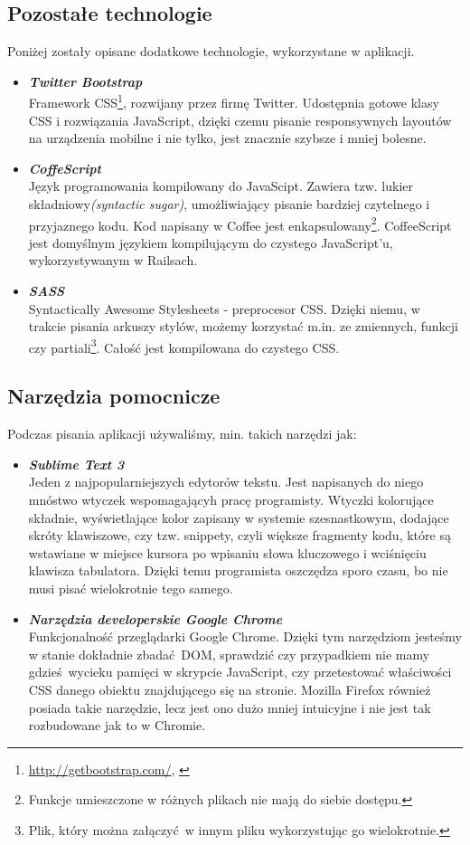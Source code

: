   \subsection{Pozostałe technologie}
    \label{other_technology}
    Poniżej zostały opisane dodatkowe technologie, wykorzystane w aplikacji.
    \begin{itemize}
      \item \textbf{\emph{Twitter Bootstrap}} \\
      Framework CSS\footnote{\url{http://getbootstrap.com/}, \cite{bootstrap}}, rozwijany przez firmę Twitter. Udostępnia gotowe klasy CSS i rozwiązania JavaScript, dzięki czemu pisanie responsywnych layoutów na urządzenia mobilne i nie tylko, jest znacznie szybsze i mniej bolesne.
      \item \textbf{\emph{CoffeScript}} \\
      Język programowania kompilowany do JavaScipt\cite{coffee}. Zawiera tzw. lukier składniowy\emph{(syntactic sugar)}, umożliwiający pisanie bardziej czytelnego i przyjaznego kodu. Kod napisany w Coffee jest enkapsulowany\footnote{Funkcje umieszczone w różnych plikach nie mają do siebie dostępu.}. CoffeeScript jest domyślnym językiem kompilującym do czystego JavaScript'u, wykorzystywanym w Railsach.
      \item \textbf{\emph{SASS}} \\
      Syntactically Awesome Stylesheets\cite{sass} - preprocesor CSS. Dzięki niemu, w~ trakcie pisania arkuszy stylów, możemy korzystać m.in. ze zmiennych, funkcji czy partiali\footnote{Plik, który można załączyć w innym pliku wykorzystując go wielokrotnie.}. Całość jest kompilowana do czystego CSS.
    \end{itemize}
  \subsection{Narzędzia pomocnicze}
    Podczas pisania aplikacji używaliśmy, min. takich narzędzi jak:
    \begin{itemize}
      \item \textbf{\emph{Sublime Text 3}} \\
      Jeden z najpopularniejszych edytorów tekstu. Jest napisanych do niego mnóstwo wtyczek wspomagającyh pracę programisty. Wtyczki kolorujące składnie, wyświetlające kolor zapisany w systemie szesnastkowym, dodające skróty klawiszowe, czy tzw. snippety, czyli większe fragmenty kodu, które są wstawiane w miejsce kursora po wpisaniu słowa kluczowego i wciśnięciu klawisza tabulatora. Dzięki temu programista oszczędza sporo czasu, bo nie musi pisać wielokrotnie tego samego.
      \item \textbf{\emph{Narzędzia developerskie Google Chrome}} \\
      Funkcjonalność przeglądarki Google Chrome. Dzięki tym narzędziom jesteśmy w stanie dokładnie zbadać DOM, sprawdzić czy przypadkiem nie mamy gdzieś wycieku pamięci w skrypcie JavaScript, czy przetestować właściwości CSS danego obiektu znajdującego się na stronie. Mozilla Firefox również posiada takie narzędzie, lecz jest ono dużo mniej intuicyjne i nie jest tak rozbudowane jak to w Chromie.
    \end{itemize}
